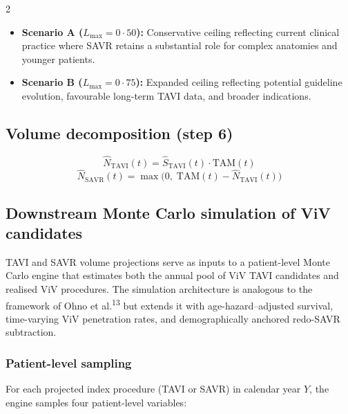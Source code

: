 \documentclass[10pt, a4paper]{article}
\begin{document}
\begin{multicols}{2}
\begin{itemize}[leftmargin=*, itemsep=2pt]
    \item \textbf{Scenario A ($L_{\max} = 0{\cdot}50$):} Conservative ceiling reflecting current clinical practice where SAVR retains a substantial role for complex anatomies and younger patients.
    \item \textbf{Scenario B ($L_{\max} = 0{\cdot}75$):} Expanded ceiling reflecting potential guideline evolution, favourable long-term TAVI data, and broader indications.
\end{itemize}

\subsection{Volume decomposition (step 6)}

%
\begin{equation}
\hat{N}_{\mathrm{TAVI}}(t) = \hat{S}_{\mathrm{TAVI}}(t) \cdot \mathrm{TAM}(t)
\end{equation}
\begin{equation}
\hat{N}_{\mathrm{SAVR}}(t) = \max\!\bigl(0,\; \mathrm{TAM}(t) - \hat{N}_{\mathrm{TAVI}}(t)\bigr)
\end{equation}

\subsection{Downstream Monte Carlo simulation of ViV candidates}

TAVI and SAVR volume projections serve as inputs to a patient-level Monte Carlo engine that estimates both the annual pool of ViV TAVI candidates and realised ViV procedures. The simulation architecture is analogous to the framework of Ohno et al.\textsuperscript{13} but extends it with age-hazard--adjusted survival, time-varying ViV penetration rates, and demographically anchored redo-SAVR subtraction.

\subsubsection{Patient-level sampling}

For each projected index procedure (TAVI or SAVR) in calendar year $Y$, the engine samples four patient-level variables:


\end{multicols}
\end{document}
